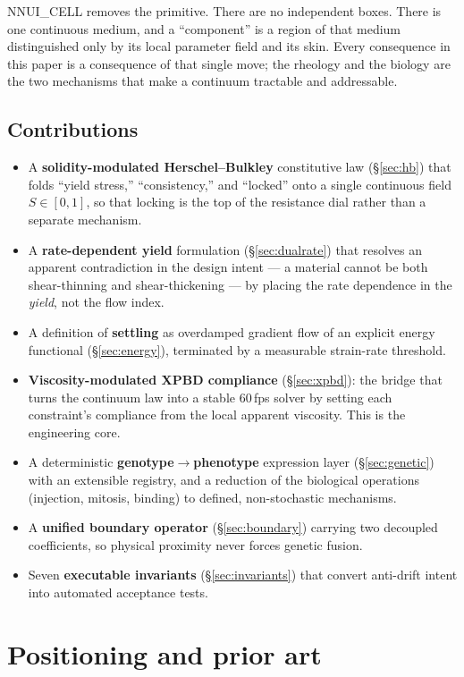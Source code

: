 \documentclass[11pt]{article}
\begin{document}
NNUI\_CELL removes the primitive. There are no independent boxes. There is one continuous
medium, and a ``component'' is a region of that medium distinguished only by its local
parameter field and its skin. Every consequence in this paper is a consequence of that single
move; the rheology and the biology are the two mechanisms that make a continuum tractable and
addressable.

\subsection{Contributions}
\begin{itemize}[leftmargin=1.4em]
  \item A \textbf{solidity-modulated Herschel--Bulkley} constitutive law (\S\ref{sec:hb}) that
  folds ``yield stress,'' ``consistency,'' and ``locked'' onto a single continuous field
  $S\in[0,1]$, so that locking is the top of the resistance dial rather than a separate mechanism.
  \item A \textbf{rate-dependent yield} formulation (\S\ref{sec:dualrate}) that resolves an
  apparent contradiction in the design intent --- a material cannot be both shear-thinning and
  shear-thickening --- by placing the rate dependence in the \emph{yield}, not the flow index.
  \item A definition of \textbf{settling} as overdamped gradient flow of an explicit energy
  functional (\S\ref{sec:energy}), terminated by a measurable strain-rate threshold.
  \item \textbf{Viscosity-modulated XPBD compliance} (\S\ref{sec:xpbd}): the bridge that turns
  the continuum law into a stable 60\,fps solver by setting each constraint's compliance from
  the local apparent viscosity. This is the engineering core.
  \item A deterministic \textbf{genotype$\rightarrow$phenotype} expression layer
  (\S\ref{sec:genetic}) with an extensible registry, and a reduction of the biological operations
  (injection, mitosis, binding) to defined, non-stochastic mechanisms.
  \item A \textbf{unified boundary operator} (\S\ref{sec:boundary}) carrying two decoupled
  coefficients, so physical proximity never forces genetic fusion.
  \item Seven \textbf{executable invariants} (\S\ref{sec:invariants}) that convert anti-drift
  intent into automated acceptance tests.
\end{itemize}

\section{Positioning and prior art}
\end{document}
